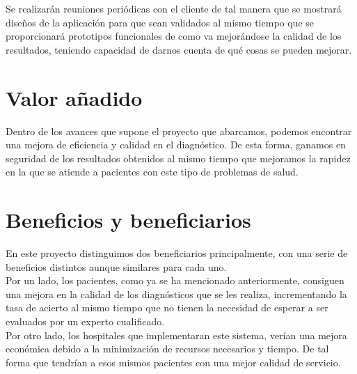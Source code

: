 \documentclass[a4paper,12pt,oneside]{article}
\begin{document}
Se realizarán reuniones periódicas con el cliente de tal manera que se mostrará diseños de la aplicación para que sean validados al mismo tiempo que se proporcionará prototipos funcionales de como va mejorándose la calidad de los resultados, teniendo capacidad de darnos cuenta de qué cosas se pueden mejorar.

\section{Valor añadido}

Dentro de los avances que supone el proyecto que abarcamos, podemos encontrar una mejora de eficiencia y calidad en el diagnóstico. De esta forma, ganamos en seguridad de los resultados obtenidos al mismo tiempo que mejoramos la rapidez en la que se atiende a pacientes con este tipo de problemas de salud.

\section{Beneficios y beneficiarios}

En este proyecto distinguimos dos beneficiarios principalmente, con una serie de beneficios distintos aunque similares para cada uno. \\

Por un lado, los pacientes, como ya se ha mencionado anteriormente, consiguen una mejora en la calidad de los diagnósticos que se les realiza, incrementando la tasa de acierto al mismo tiempo que no tienen la necesidad de esperar a ser evaluados por un experto cualificado. \\

Por otro lado, los hospitales que implementaran este sistema, verían una mejora económica debido a la minimización de recursos necesarios y tiempo. De tal forma que tendrían a esos mismos pacientes con una mejor calidad de servicio.













\end{document}
